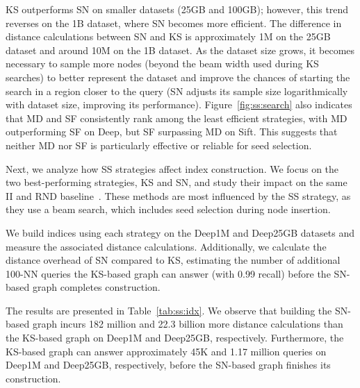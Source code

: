 KS outperforms SN on smaller datasets (25GB and 100GB); however, this trend reverses on the 1B dataset, where SN becomes more efficient. The difference in distance calculations between SN and KS is approximately 1M on the 25GB dataset and around 10M on the 1B dataset. As the dataset size grows, it becomes necessary to sample more nodes (beyond the beam width used during KS searches) to better represent the dataset and improve the chances of starting the search in a region closer to the query (SN adjusts its sample size logarithmically with dataset size, improving its performance). Figure~\ref{fig:ss:search} also indicates that MD and SF consistently rank among the least efficient strategies, with MD outperforming SF on Deep, but SF surpassing MD on Sift. This suggests that neither MD nor SF is particularly effective or reliable for seed selection.

Next, we analyze how SS strategies affect index construction. We focus on the two best-performing strategies, KS and SN, and study their impact on the same II and RND baseline~\cite{nsw11,dpg,hnsw,nsg,nssg,vamana,elpis,SPTAG1}. These methods are most influenced by the SS strategy, as they use a beam search, which includes seed selection during node insertion.

We build indices using each strategy on the Deep1M and Deep25GB datasets and measure the associated distance calculations. Additionally, we calculate the distance overhead of SN compared to KS, estimating the number of additional 100-NN queries the KS-based graph can answer (with 0.99 recall) before the SN-based graph completes construction.

The results are presented in Table~\ref{tab:ss:idx}. We observe that building the SN-based graph incurs 182 million and 22.3 billion more distance calculations than the KS-based graph on Deep1M and Deep25GB, respectively. Furthermore, the KS-based graph can answer approximately 45K and 1.17 million queries on Deep1M and Deep25GB, respectively, before the SN-based graph finishes its construction.


\newcommand{\sfig}{0.28}
\newcommand{\spbfig}{0.3}

